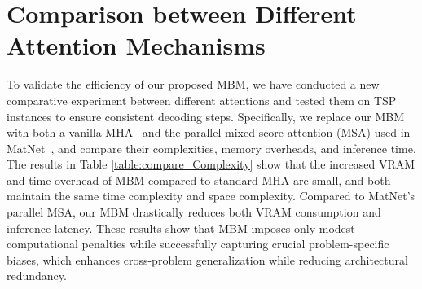 \documentclass{article}
\theoremstyle{plain}
\theoremstyle{definition}
\theoremstyle{remark}
\begin{document}
\section{Comparison between Different Attention Mechanisms}
\label{append:compare_msa}
\begin{table}[htbp]
\vskip 0.15in
\centering
\caption{Comparison between different attention mechanisms. Here, $N,d,m$ denote the sequence length, feature dimension, and extra hidden layer dimension of mixed-score attention, respectively. Values in parentheses represent the percentage increase or decrease relative to URS and Avg. Peak VRAM represents the average peak VRAM per instance.}
\label{table:compare_Complexity}
\vskip -0.1in
\end{table} 

To validate the efficiency of our proposed MBM, we have conducted a new comparative experiment between different attentions and tested them on TSP instances to ensure consistent decoding steps. Specifically, we replace our MBM with both a vanilla MHA~\citep{vaswani2017attention} and the parallel mixed-score attention (MSA) used in MatNet~\citep{kwon2021matnet}, and compare their complexities, memory overheads, and inference time. The results in Table \ref{table:compare_Complexity} show that the increased VRAM and time overhead of MBM compared to standard MHA are small, and both maintain the same time complexity and space complexity. Compared to MatNet's parallel MSA, our MBM drastically reduces both VRAM consumption and inference latency. These results show that MBM imposes only modest computational penalties while successfully capturing crucial problem-specific biases, which enhances cross-problem generalization while reducing architectural redundancy.
\end{document}
